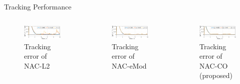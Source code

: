\documentclass[8pt, aspectratio=169]{beamer}
\begin{document}
\begin{frame}{\insertsubsectionhead}{Tracking Performance}

  \begin{columns}
    

      \begin{figure}      
        \includegraphics[width=0.99\textwidth]{figures/ECC/fig6.eps}
        \caption{Tracking error of NAC-L2}
      \end{figure}
      

      \begin{figure}
        \includegraphics[width=0.99\textwidth]{figures/ECC/fig7.eps}
        \caption{Tracking error of NAC-eMod}
      \end{figure}


      \begin{figure}
        \includegraphics[width=0.99\textwidth]{figures/ECC/fig5.eps}
        \caption{Tracking error of NAC-CO (proposed)}
      \end{figure}


\end{columns}
\end{frame}
\end{document}
